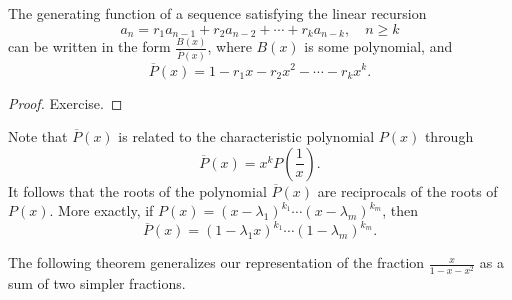 \begin{page}
\setcounter{section}{2}
\setcounter{subsection}{3}
\setcounter{dfn}{10}
\label{portion:851}

\begin{thm}
The generating function of a sequence satisfying the linear recursion
\[
a_n = r_1 a_{n-1} + r_2 a_{n-2} + \cdots + r_k a_{n-k}, \quad n \ge k
\]
can be written in the form $\frac{B(x)}{\overline{P}(x)}$, where $B(x)$ is some polynomial, and
\[
\overline{P}(x) = 1 - r_1 x - r_2 x^2 - \cdots - r_k x^k.
\]
\end{thm}

\end{page}

\begin{page}
\setcounter{section}{2}
\setcounter{subsection}{3}
\setcounter{dfn}{10}
\label{portion:852}


\begin{proof}
Exercise.
\end{proof}

Note that $\overline{P}(x)$ is related to the characteristic polynomial $P(x)$ through
\[
\overline{P}(x) = x^k P\left(\frac1x\right).
\]
It follows that the roots of the polynomial $\overline{P}(x)$ are reciprocals of the roots of $P(x)$.
More exactly, if $P(x) = (x - \lambda_1)^{k_1} \cdots (x - \lambda_m)^{k_m}$, then
\[
\overline{P}(x) = (1 - \lambda_1 x)^{k_1} \cdots (1- \lambda_m)^{k_m}.
\]

The following theorem generalizes our representation of the fraction $\frac{x}{1-x-x^2}$ as a sum of two simpler fractions.

\end{page}

